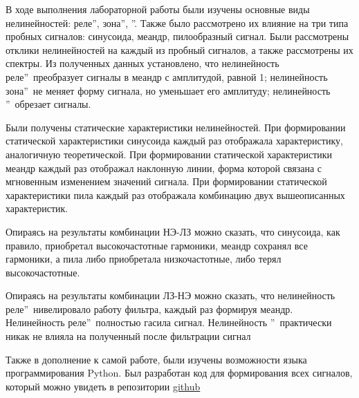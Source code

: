 В ходе выполнения лабораторной работы были изучены основные виды
нелинейностей:  реле\textquotedblright,
 зона\textquotedblright,
\textquotedblright. Также было
рассмотрено их влияние на три типа пробных сигналов: синусоида,
меандр, пилообразный сигнал. Были рассмотрены отклики нелинейностей
на каждый из пробный сигналов, а также рассмотрены их спектры.
Из полученных данных установлено, что нелинейность
 реле\textquotedblright\ преобразует сигналы
в меандр с амплитудой, равной 1; нелинейность
 зона\textquotedblright\ не меняет форму
сигнала, но уменьшает его амплитуду; нелинейность
\textquotedblright\ обрезает сигналы.

Были получены статические характеристики нелинейностей. При формировании
статической характеристики синусоида каждый раз отображала характеристику,
аналогичную теоретической. При формировании статической характеристики
меандр каждый раз отображал наклонную линии, форма которой связана с
мгновенным изменением значений сигнала. При формировании статической
характеристики пила каждый раз отображала комбинацию двух вышеописанных
характеристик. 

Опираясь на результаты комбинации НЭ-ЛЗ можно сказать, что синусоида,
как правило, приобретал высокочастотные гармоники, меандр сохранял
все гармоники, а пила либо приобретала низкочастотные, либо терял
высокочастотные.

Опираясь на результаты комбинации ЛЗ-НЭ можно сказать, что
нелинейность  реле\textquotedblright\ 
нивелировало работу фильтра, каждый раз формируя меандр.
Нелинейность  реле\textquotedblright\  
полностью гасила сигнал. Нелинейность 
\textquotedblleftНасыщение\textquotedblright\ практически никак не
влияла на полученный после фильтрации сигнал

Также в дополнение к самой работе, были изучены возможности языка
программирования Python. Был разработан код для формирования всех сигналов,
который можно увидеть в репозитории \href{https://github.com/MaxAizy/TAC/tree/main/lab1}{github}